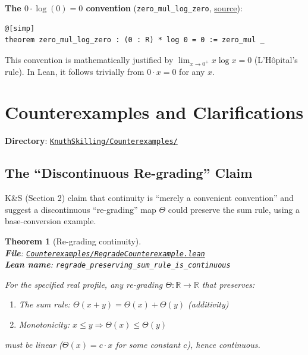 \documentclass[11pt]{article}
\newtheorem{theorem}{Theorem}[section]
\theoremstyle{definition}
\theoremstyle{remark}
\begin{document}
\textbf{The $0 \cdot \log(0) = 0$ convention} (\texttt{zero\_mul\_log\_zero}, \href{https://github.com/zariuq/ks-foundations-of-inference/blob/main/KnuthSkilling/Information/InformationEntropy.lean}{source}):
\begin{lstlisting}[caption={Convention for entropy at zero probability},numbers=none]
@[simp]
theorem zero_mul_log_zero : (0 : R) * log 0 = 0 := zero_mul _
\end{lstlisting}
This convention is mathematically justified by $\lim_{x \to 0^+} x \log x = 0$ (L'H\^opital's rule). In Lean, it follows trivially from $0 \cdot x = 0$ for any $x$.

\section{Counterexamples and Clarifications}

\textbf{Directory}: \href{https://github.com/zariuq/ks-foundations-of-inference/tree/main/KnuthSkilling/Counterexamples/}{\texttt{KnuthSkilling/Counterexamples/}}

\subsection{The ``Discontinuous Re-grading'' Claim}

K\&S (Section 2) claim that continuity is ``merely a convenient convention'' and suggest
a discontinuous ``re-grading'' map $\Theta$ could preserve the sum rule, using a
base-conversion example.

\begin{theorem}[Re-grading continuity]
\leavevmode\\
\textbf{File}: \href{https://github.com/zariuq/ks-foundations-of-inference/blob/main/KnuthSkilling/Counterexamples/RegradeCounterexample.lean}{\texttt{Counterexamples/RegradeCounterexample.lean}}\\
\textbf{Lean name}: \texttt{regrade\_preserving\_sum\_rule\_is\_continuous}

For the specified real profile, any re-grading $\Theta: \mathbb{R} \to \mathbb{R}$ that preserves:
\begin{enumerate}
\item The sum rule: $\Theta(x + y) = \Theta(x) + \Theta(y)$ (additivity)
\item Monotonicity: $x \leq y \Rightarrow \Theta(x) \leq \Theta(y)$
\end{enumerate}
must be linear ($\Theta(x) = c \cdot x$ for some constant $c$), hence continuous.
\end{theorem}
\end{document}
